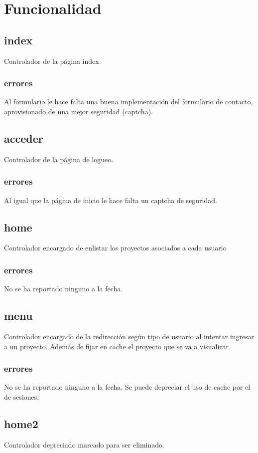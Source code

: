 \documentclass[10pt,a4paper]{book}
\begin{document}
	\section{Funcionalidad}
	
	\subsection{index}
	Controlador de la página index.
		
	\subsubsection{errores} Al formulario le hace falta una buena implementación del formulario de contacto, aprovisionado de una mejor seguridad (captcha).
	
	
	\subsection{acceder} 
	Controlador de la página de logueo.
	
	\subsubsection{errores}
	Al igual que la página de inicio le hace falta un captcha de seguridad.
	
	\subsection{home}
	Controlador encargado de enlistar los proyectos asociados a cada usuario
	\subsubsection{errores}
	No se ha reportado ninguno a la fecha.
	
	\subsection{menu}
	Controlador encargado de la redirección según tipo de usuario al intentar ingresar a un proyecto. Además de fijar en cache el proyecto que se va a visualizar.
	\subsubsection{errores}
	No se ha reportado ninguno a la fecha. Se puede depreciar el uso de cache por el de sesiones.

	\subsection{home2}
	Controlador depreciado marcado para ser eliminado.
\end{document}
